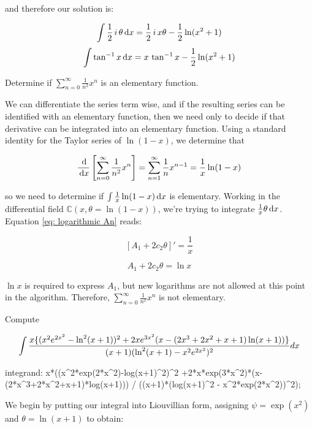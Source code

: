 and therefore our solution is:

$$\int {1\over2}\,i\,\theta\, {\rm d}x = {1\over2}\,i\,x \theta - \frac{1}{2}\ln(x^2+1)$$
$$\int \tan^{-1} x\, {\rm d}x = x\,\tan^{-1} x - \frac{1}{2}\ln(x^2+1)$$


\endexample

\vfill\eject

\example Determine if $\sum_{n=0}^\infty \frac{1}{n^2} x^n$ is an elementary function.

We can differentiate the series term wise, and if the resulting series
can be identified with an elementary function, then we need only to
decide if that derivative can be integrated into an elementary
function.  Using a standard identity for the Taylor series of $\ln
(1-x)$, we determine that

$$\frac{\,\mathrm{d}}{\,\mathrm{d} x} \left[ \sum_{n=0}^\infty \frac{1}{n^2} x^n \right] = \sum_{n=1}^\infty \frac{1}{n} x^{n-1} = \frac{1}{x}\ln (1-x)$$

so we need to determine if $\int \frac{1}{x}\ln (1-x) \,\mathrm{d} x$ is elementary.  Working in the
differential field ${\mathbb C}(x,\theta = \ln (1-x))$, we're trying to integrate
$\frac{1}{x}\theta \,\mathrm{d} x$.  Equation \eqref{eq: logarithmic An} reads:

$$\left[ A_1 + 2 c_2 \theta \right]' = \frac{1}{x}$$

$$A_1 + 2 c_2 \theta = \ln x$$

$\ln x$ is required to express $A_1$, but new logarithms are not
allowed at this point in the algorithm.  Therefore,
$\sum_{n=0}^\infty \frac{1}{n^2} x^n$ is not elementary.

\endexample

\vfill\eject

\example\label{hard log-exp integral}
Compute


$$\int{{x\{(x^2e^{2x^2}-\ln^2(x+1))^2+2xe^{3x^2}(x-(2x^3+2x^2+x+1)\ln(x+1))\}}\over{(x+1)(\ln^2(x+1) - x^2e^{2x^2})^2}} dx$$

\begin{maximacode}
integrand:
   x*((x^2*exp(2*x^2)-log(x+1)^2)^2
      +2*x*exp(3*x^2)*(x-(2*x^3+2*x^2+x+1)*log(x+1)))
   / ((x+1)*(log(x+1)^2 - x^2*exp(2*x^2))^2);
\end{maximacode}

We begin by putting our integral into Liouvillian form, assigning $\psi = \exp(x^2)$ and $\theta = \ln (x+1)$ to obtain:

